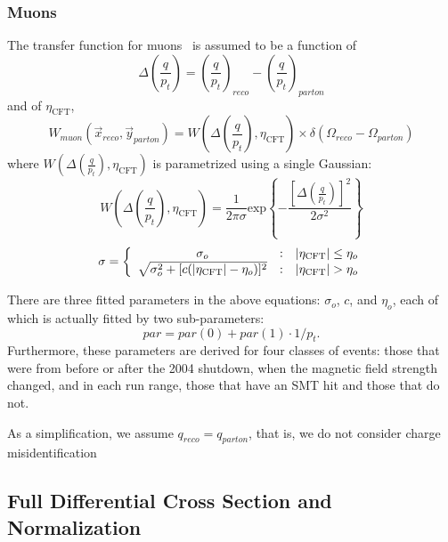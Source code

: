 \subsubsection{Muons}

The transfer function for muons~\cite{MuonTF} is assumed to be a
function of
\begin{equation}
\Delta\left( \frac{q}{p_t}\right) =
\left( \frac{q}{p_t}\right)_{reco} -
\left( \frac{q}{p_t}\right)_{parton}
\end{equation}
\noindent and of $\eta_\mathrm{CFT}$,
\begin{equation}
W_{muon}(\vec{x}_{reco}, \vec{y}_{parton}) =
W\left(\Delta\left( \frac{q}{p_t}\right),
\eta_\mathrm{CFT}\right) \times 
\delta(\Omega_{reco} - \Omega_{parton})
\end{equation}
\noindent where $W\left(\Delta\left( \frac{q}{p_t}\right),
\eta_\mathrm{CFT}\right)$ is parametrized using a single Gaussian:
\begin{equation}
W\left(\Delta\left( \frac{q}{p_t}\right), \eta_\mathrm{CFT}\right) = 
\frac{1}{2\pi\sigma}\mathrm{exp}
\left\{-\frac{\left[\Delta
\left( \frac{q}{p_t} \right)\right]^2}
{2\sigma^2}\right\}
\end{equation}
\begin{equation}
\sigma  =  \left\{ 
\begin{array} {c@{\quad:\quad}l} \sigma_o &
|\eta_\mathrm{CFT}| \le \eta_o \\
\sqrt{\sigma^2_o + [c(|\eta_\mathrm{CFT}| - \eta_o)]^2} &
|\eta_\mathrm{CFT}| > \eta_o 
\end{array} \right.
\end{equation}

\noindent There are three fitted parameters in the above equations:
$\sigma_o$, $c$, and $\eta_o$, each of which is actually fitted by two
sub-parameters:
\begin{equation}
par = par(0) + par(1) \cdot 1/p_t.
\end{equation}
\noindent Furthermore, these parameters are derived for four classes
of events: those that were from before or after the 2004 shutdown,
when the magnetic field strength changed, and in each run range, those
that have an SMT hit and those that do not.

As a simplification, we assume $q_{reco} = q_{parton}$, that is, we
do not consider charge misidentification


\subsection{Full Differential Cross Section and Normalization}

